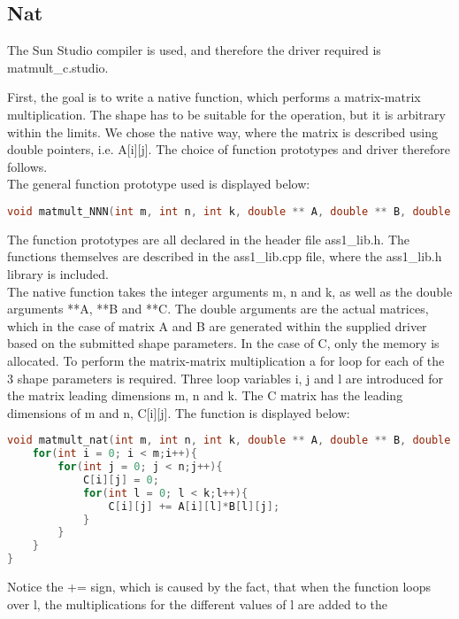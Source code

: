 \subsection{Nat}

The Sun Studio compiler is used, and therefore the driver required is matmult\_c.studio.


First, the goal is to write a native function, which performs a matrix-matrix multiplication. The shape has to be suitable for the operation, but it is arbitrary within the limits. We chose the native way, where the matrix is described using double pointers, i.e. A[i][j]. The choice of function prototypes and driver therefore follows.  \\
The general function prototype used is displayed below:
\begin{lstlisting}[language=C++, caption=Function Prototype]
void matmult_NNN(int m, int n, int k, double ** A, double ** B, double ** C)
\end{lstlisting}

The function prototypes are all declared in the header file ass1\_lib.h. The functions themselves are described in the ass1\_lib.cpp file, where the ass1\_lib.h library is included. \\

The native function takes the integer arguments m, n and k, as well as the double arguments **A, **B and **C. The double arguments are the actual matrices, which in the case of matrix A and B are generated within the supplied driver based on the submitted shape parameters. In the case of C, only the memory is allocated. To perform the matrix-matrix multiplication a for loop for each of the 3 shape parameters is required. Three loop variables i, j and l are introduced for the matrix leading dimensions m, n and k. The C matrix has the leading dimensions of m and n, C[i][j]. The function is displayed below:

\begin{lstlisting}[language=C++, caption=Function Prototype]
void matmult_nat(int m, int n, int k, double ** A, double ** B, double ** C){
	for(int i = 0; i < m;i++){
		for(int j = 0; j < n;j++){
			C[i][j] = 0;
			for(int l = 0; l < k;l++){
				C[i][j] += A[i][l]*B[l][j];
			}
		}
	}
}
\end{lstlisting}

Notice the += sign, which is caused by the fact, that when the function loops over l, the multiplications for the different values of l are added to the 